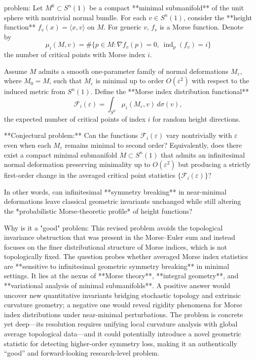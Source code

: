 problem:  
Let \(M^k \subset S^{n}(1)\) be a compact **minimal submanifold** of the unit sphere with nontrivial normal bundle.  
For each \(v \in S^{n}(1)\), consider the **height function** \(f_v(x) = \langle x, v \rangle\) on \(M\).  For generic \(v\), \(f_v\) is a Morse function.  Denote by  
\[
\mu_i(M,v) = \#\{p \in M : \nabla f_v(p)=0,\ \operatorname{ind}_p(f_v)=i\}
\]
the number of critical points with Morse index \(i\).  

Assume \(M\) admits a smooth one-parameter family of normal deformations \(M_\varepsilon\), where \(M_0=M\), such that \(M_\varepsilon\) is minimal up to order \(O(\varepsilon^2)\) with respect to the induced metric from \(S^n(1)\).  Define the **Morse index distribution functional**
\[
\mathcal{F}_i(\varepsilon) = \int_{S^n} \mu_i(M_\varepsilon,v)\, d\sigma(v),
\]
the expected number of critical points of index \(i\) for random height directions.

**Conjectural problem:**  
Can the functions \(\mathcal{F}_i(\varepsilon)\) vary nontrivially with \(\varepsilon\) even when each \(M_\varepsilon\) remains minimal to second order?  
Equivalently, does there exist a compact minimal submanifold \(M\subset S^n(1)\) that admits an infinitesimal normal deformation preserving minimality up to \(O(\varepsilon^2)\) but producing a strictly first-order change in the averaged critical point statistics \(\{\mathcal{F}_i(\varepsilon)\}\)?  

In other words, can infinitesimal **symmetry breaking** in near-minimal deformations leave classical geometric invariants unchanged while still altering the *probabilistic Morse-theoretic profile* of height functions?

Why is it a "good" problem:  
This revised problem avoids the topological invariance obstruction that was present in the Morse–Euler sum and instead focuses on the finer distributional structure of Morse indices, which is not topologically fixed.  The question probes whether averaged Morse index statistics are **sensitive to infinitesimal geometric symmetry breaking** in minimal settings.  
It lies at the nexus of **Morse theory**, **integral geometry**, and **variational analysis of minimal submanifolds**.  A positive answer would uncover new quantitative invariants bridging stochastic topology and extrinsic curvature geometry; a negative one would reveal rigidity phenomena for Morse index distributions under near-minimal perturbations.  
The problem is concrete yet deep—its resolution requires unifying local curvature analysis with global average topological data—and it could potentially introduce a novel geometric statistic for detecting higher-order symmetry loss, making it an authentically “good” and forward-looking research-level problem.